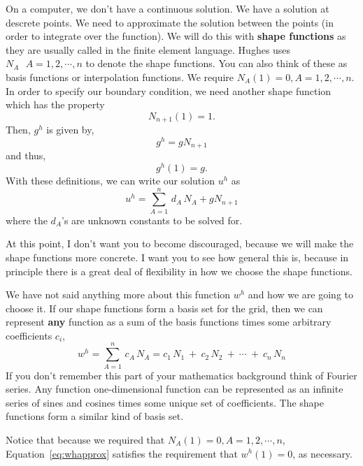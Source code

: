 \documentclass{article}
\begin{document}
On a computer, we don't have a continuous solution.  We have a solution at
descrete points.  We need to approximate the solution between the points (in
order to integrate over the function).    We will do this with {\bf shape
functions} as they are usually called in the finite element language.  Hughes
uses $N_A  ~~~A=1, 2, \cdots , n$ to denote the shape functions.   You can also
think of these as basis functions or interpolation functions.  We require $ N_A
(1) = 0, A=1,2, \cdots, n$.   In order to specify our boundary condition, we
need another shape function which has the property
\begin{equation}
N_{n+1} (1) = 1.
\end{equation}
Then, $g^h$ is given by,
\begin{equation}
g^h = g N_{n+1} 
\end{equation}
and thus,
\begin{equation} 
g^h (1) = g.
\end{equation}
With these definitions, we can write our solution $u^h$ as
\begin{equation}
u^h = \sum_{A=1}^{n} \, d_A \, N_A + g N_{n+1}
\end{equation}
where the $d_A$'s are unknown constants to be solved for.

At this point, I don't want you to become discouraged, because we will make the
shape functions more concrete.   I want you to see how general this is, because
in principle there is a great deal of flexibility in how we choose the shape
functions.

We have not said anything more about this function $w^h$ and how we are going
to choose it.    If our shape functions form a basis set for the grid,  then we
can represent {\bf any} function as a sum of the basis functions times some
arbitrary coefficients $c_i$, 
\begin{equation}
w^h = \sum_{A=1}^{n} \, c_A \, N_A = c_1 \, N_1 ~+~ c_2 \, N_2 ~+~ \cdots ~+~
c_n \, N_n \label{eq:whapprox}
\end{equation}
If you don't remember this part of your mathematics background think of Fourier
series.  Any function one-dimensional function can be represented as an
infinite series of sines and cosines times some unique set of coefficients.  
The shape functions form a similar kind of basis set.

Notice that because we required that $ N_A (1) = 0, A=1,2, \cdots, n$,
Equation~\ref{eq:whapprox} satisfies the requirement that $w^h (1) = 0$, as
necessary.   
\end{document}

